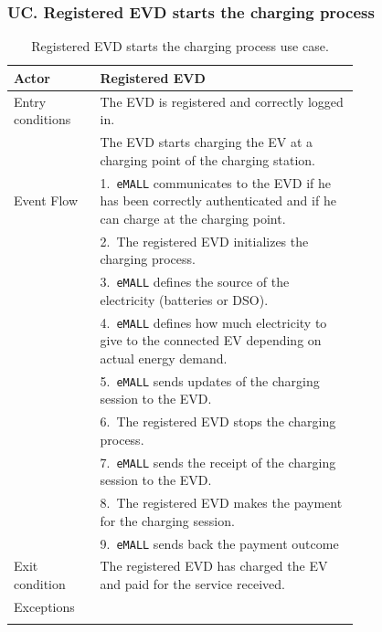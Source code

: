 \subsubsection*{UC\cuc . Registered EVD starts the charging process}
\begin{center}
    \begin{longtable}{lp{0.75\linewidth}}
        \hline
        Actor            & Registered EVD                                                                                                       \\
        \hline
        Entry conditions & The EVD is registered and correctly logged in.                                                                       \\
        & The EVD starts charging the EV at a charging point of the charging station.                                          \\
        \hline
        Event Flow       & 1.\ \verb|eMALL| communicates to the EVD if he has been correctly authenticated and if he can charge at the charging point. \\
        & 2.\ The registered EVD initializes the charging process.                                                             \\
        & 3.\ \verb|eMALL| defines the source of the electricity (batteries or DSO).                                                  \\
        & 4.\ \verb|eMALL| defines how much electricity to give to the connected EV depending on actual energy demand.                \\
        & 5.\ \verb|eMALL| sends updates of the charging session to the EVD.                                                          \\
        & 6.\ The registered EVD stops the charging process.                                                                   \\
        & 7.\ \verb|eMALL| sends the receipt of the charging session to the EVD.                                                      \\
        & 8.\ The registered EVD makes the payment for the charging session.                                                   \\
        & 9.\ \verb|eMALL| sends back the payment outcome                                                                             \\
        \hline
        Exit condition   & The registered EVD has charged the EV and paid for the service received.                                             \\
        \hline
        Exceptions       &                                                                                                                      \\
        \hline
        \caption{Registered EVD starts the charging process use case.}
        \label{tab: EVD_charges_EV_use_case}
    \end{longtable}


\end{center}
